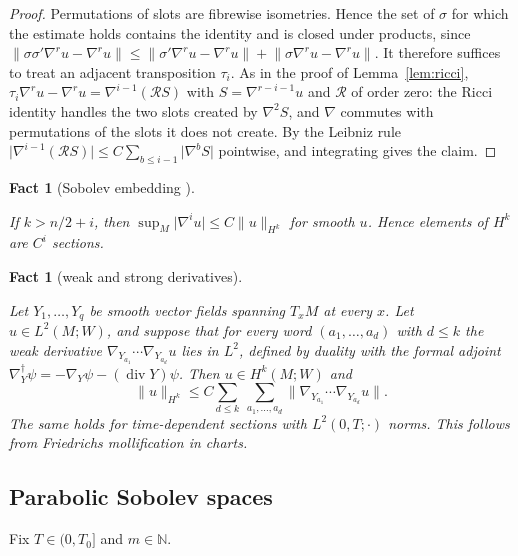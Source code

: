 \documentclass[11pt,reqno]{amsart}
\newtheorem{fact}[theorem]{Fact}
\theoremstyle{definition}
\theoremstyle{remark}
\newcommand{\N}{\mathbb{N}}
\newcommand{\norm}[1]{\lVert #1\rVert}
\newcommand{\abs}[1]{\lvert #1\rvert}
\newcommand{\uses}[1]{}
\newcommand{\source}[1]{}
\numberwithin{equation}{section}
\begin{document}
\begin{proof}
Permutations of slots are fibrewise isometries. Hence the set of $\sigma$ for which the estimate
holds contains the identity and is closed under products, since
$\norm{\sigma\sigma'\nabla^ru-\nabla^ru}\le\norm{\sigma'\nabla^ru-\nabla^ru}+\norm{\sigma\nabla^ru-\nabla^ru}$.
It therefore suffices to treat an adjacent transposition $\tau_i$. As in the proof of
Lemma~\ref{lem:ricci}, $\tau_i\nabla^ru-\nabla^ru=\nabla^{i-1}(\mathcal RS)$ with
$S=\nabla^{r-i-1}u$ and $\mathcal R$ of order zero: the Ricci identity handles the two slots created
by $\nabla^2S$, and $\nabla$ commutes with permutations of the slots it does not create. By the
Leibniz rule $\abs{\nabla^{i-1}(\mathcal RS)}\le C\sum_{b\le i-1}\abs{\nabla^bS}$ pointwise, and
integrating gives the claim.
\end{proof}

\begin{fact}[Sobolev embedding {\cite{Aubin,Hebey}}]\label{fact:sobolev}
\uses{def:sobolev}
\source{DG: Analysis/Sobolev/Embedding/Tensor (spectral norms; needs norm equivalence)}
If $k>n/2+i$, then $\sup_M\abs{\nabla^iu}\le C\norm{u}_{H^k}$ for smooth $u$. Hence elements of $H^k$
are $C^i$ sections.
\end{fact}

\begin{fact}[weak and strong derivatives]\label{fact:weak}
\uses{def:sobolev}
\source{DG: Analysis/Sobolev/Intrinsic (to check)}
Let $Y_1,\dots,Y_q$ be smooth vector fields spanning $T_xM$ at every $x$. Let $u\in L^2(M;W)$, and
suppose that for every word $(a_1,\dots,a_d)$ with $d\le k$ the weak derivative
$\nabla_{Y_{a_1}}\cdots\nabla_{Y_{a_d}}u$ lies in $L^2$, defined by duality with the formal adjoint
$\nabla_Y^\dagger\psi=-\nabla_Y\psi-(\operatorname{div}Y)\psi$. Then $u\in H^k(M;W)$ and
\[
  \norm{u}_{H^k}\le C\sum_{d\le k}\ \sum_{a_1,\dots,a_d}\norm{\nabla_{Y_{a_1}}\cdots\nabla_{Y_{a_d}}u}.
\]
The same holds for time-dependent sections with $L^2(0,T;\cdot)$ norms. This follows from Friedrichs
mollification in charts.
\end{fact}

\subsection{Parabolic Sobolev spaces}

Fix $T\in(0,T_0]$ and $m\in\N$.
\end{document}
